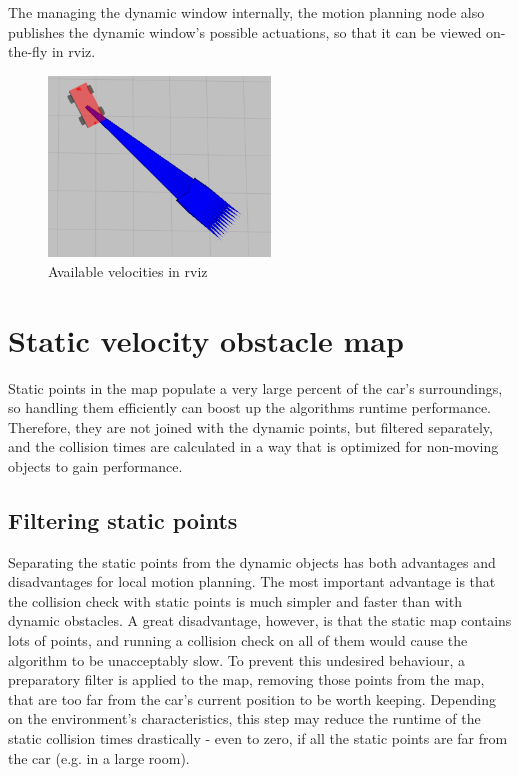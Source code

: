 The managing the dynamic window internally, the motion planning node also publishes the dynamic window's possible actuations, so that it can be viewed on-the-fly in rviz.

\begin{figure}[!ht]
    \centering
    \includegraphics[height=48mm]{figures/raw/rviz_available_velocities.png}
    \caption{Available velocities in rviz}
    \label{rviz_available_velocities}
\end{figure}

\section{Static velocity obstacle map}
\label{chap:static_velocity_obstacle_map}
Static points in the map populate a very large percent of the car's surroundings, so handling them efficiently can boost up the algorithms runtime performance. Therefore, they are not joined with the dynamic points, but filtered separately, and the collision times are calculated in a way that is optimized for non-moving objects to gain performance.

\subsection{Filtering static points}
Separating the static points from the dynamic objects has both advantages and disadvantages for local motion planning. The most important advantage is that the collision check with static points is much simpler and faster than with dynamic obstacles. A great disadvantage, however, is that the static map contains lots of points, and running a collision check on all of them would cause the algorithm to be unacceptably slow. To prevent this undesired behaviour, a preparatory filter is applied to the map, removing those points from the map, that are too far from the car's current position to be worth keeping. Depending on the environment's characteristics, this step may reduce the runtime of the static collision times drastically - even to zero, if all the static points are far from the car (e.g. in a large room).

